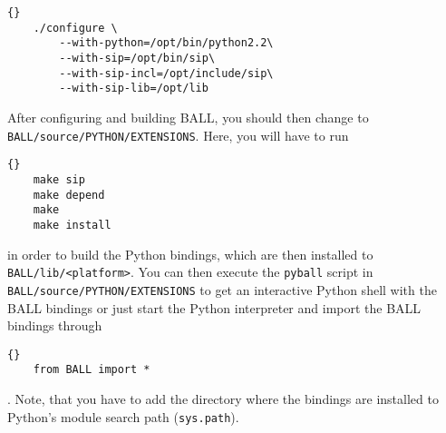\begin{lstlisting}{}
	./configure \
		--with-python=/opt/bin/python2.2\
		--with-sip=/opt/bin/sip\
		--with-sip-incl=/opt/include/sip\
		--with-sip-lib=/opt/lib
\end{lstlisting}

\noindent
After configuring and building BALL, you should then change to {\tt
BALL/source/PYTHON/EXTENSIONS}. Here, you will have to run

\begin{lstlisting}{}
	make sip
	make depend
	make
	make install
\end{lstlisting}

\noindent
in order to build the Python bindings, which are then installed to {\tt
BALL/lib/<platform>}. 
You can then execute the {\tt pyball} script in {\tt
BALL/source/PYTHON/EXTENSIONS} to get an interactive Python shell with the
BALL bindings or just start the Python interpreter and import the BALL
bindings through

\begin{lstlisting}{}
	from BALL import *
\end{lstlisting}.
\noindent
Note, that you have to add the directory where the bindings are installed to
Python's module search path ({\tt sys.path}).
